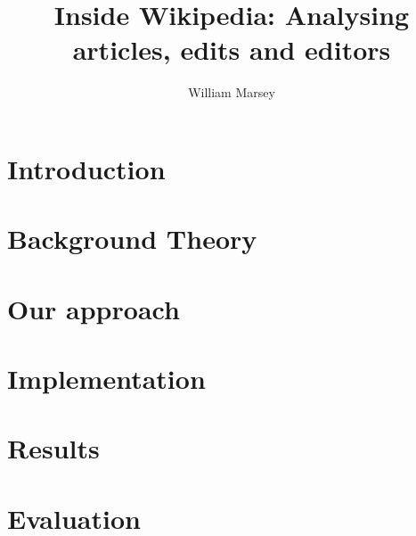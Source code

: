 \documentclass[a4paper,11pt,twoside]{report}
\begin{document}
\title{\LARGE {\bf Inside Wikipedia: Analysing articles, edits and editors}\\
 \vspace*{6mm}
}

\author{William Marsey}

\normallinespacing
\maketitle

\preface



\body
\chapter{Introduction}
\label{ch:introduction}


\chapter{Background Theory}
\label{ch:background}




\chapter{Our approach}




\chapter{Implementation}
\label{ch:implementation}




\chapter{Results}
\label{ch:results}




\chapter{Evaluation}
\label{ch:evaluation}



\end{document}
